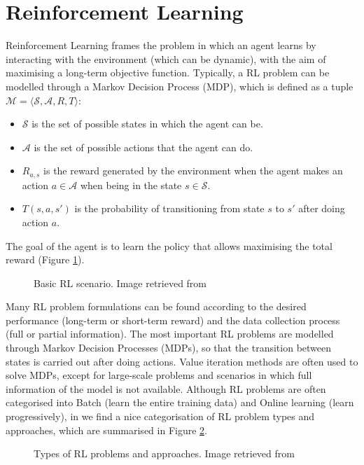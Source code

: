 \documentclass[12pt, a4paper,twoside]{tesi_upf}
\begin{document}
		
		\section{Reinforcement Learning}
		\label{section:rl}				
			Reinforcement Learning frames the problem in which an agent learns by interacting with the environment (which can be dynamic), with the aim of maximising a long-term objective function. Typically, a RL problem can be modelled through a Markov Decision Process (MDP), which is defined as a tuple $\mathcal{M} = \langle \mathcal{S}, \mathcal{A}, R, T\rangle$:
			\begin{itemize}
				\item $\mathcal{S}$ is the set of possible states in which the agent can be.
				\item $\mathcal{A}$ is the set of possible actions that the agent can do.
				\item $R_{a,s}$ is the reward generated by the environment  when the agent makes an action $a \in \mathcal{A}$ when being in the state $s \in \mathcal{S}$.
				\item $T(s,a,s')$ is the probability of transitioning from state $s$ to $s'$ after doing action $a$.
			\end{itemize}
			The goal of the agent is to learn the policy that allows maximising the total reward (Figure \ref{fig:rl_scenario}). 
			\begin{figure}[h!]
				\centering
				\caption{Basic RL scenario. Image retrieved from \cite{sutton1998reinforcement}}
				\label{fig:rl_scenario}
			\end{figure}		
		
			Many RL problem formulations can be found according to the desired performance (long-term or short-term reward) and the data collection process (full or partial information). The most important RL problems are modelled through Markov Decision Processes (MDPs), so that the transition between states is carried out after doing actions. Value iteration methods are often used to solve MDPs, except for large-scale problems and scenarios in which full information of the model is not available. Although RL problems are often categorised into Batch (learn the entire training data) and Online learning (learn progressively), in \cite{szepesvari2010algorithms} we find a nice categorisation of RL problem types and approaches, which are summarised in Figure \ref{fig:rl_types}.			
			\begin{figure}[h!]
				\centering
				\caption{Types of RL problems and approaches. Image retrieved from \cite{szepesvari2010algorithms}}
				\label{fig:rl_types}
			\end{figure}
					
\end{document}
